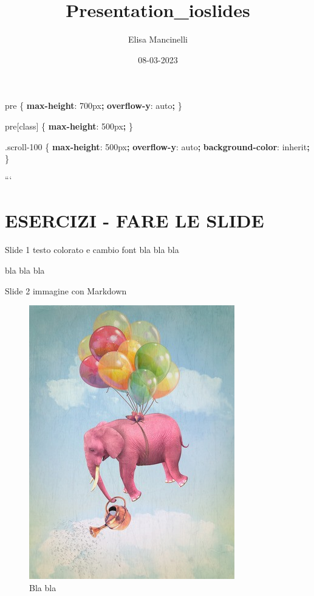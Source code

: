 \documentclass[
  ignorenonframetext,
]{beamer}
\title{Presentation\_ioslides}
\author{Elisa Mancinelli}
\date{08-03-2023}
\newenvironment{Shaded}{\begin{snugshade}}{\end{snugshade}}
\newcommand{\BuiltInTok}[1]{#1}
\newcommand{\DataTypeTok}[1]{\textcolor[rgb]{0.13,0.29,0.53}{#1}}
\newcommand{\DecValTok}[1]{\textcolor[rgb]{0.00,0.00,0.81}{#1}}
\newcommand{\ExtensionTok}[1]{#1}
\newcommand{\FunctionTok}[1]{\textcolor[rgb]{0.00,0.00,0.00}{#1}}
\newcommand{\KeywordTok}[1]{\textcolor[rgb]{0.13,0.29,0.53}{\textbf{#1}}}
\newcommand{\NormalTok}[1]{#1}
\newcommand{\OperatorTok}[1]{\textcolor[rgb]{0.81,0.36,0.00}{\textbf{#1}}}
\begin{document}
\frame{\titlepage}

\begin{frame}[fragile]
\begin{Shaded}
\begin{Highlighting}[]
\NormalTok{pre \{ }
  \KeywordTok{max{-}height}\NormalTok{: }\DecValTok{700}\DataTypeTok{px}\OperatorTok{;}
  \KeywordTok{overflow{-}y}\NormalTok{: }\BuiltInTok{auto}\OperatorTok{;}
\NormalTok{\}}

\NormalTok{pre}\ExtensionTok{[class]}\NormalTok{ \{}
  \KeywordTok{max{-}height}\NormalTok{: }\DecValTok{500}\DataTypeTok{px}\OperatorTok{;}
\NormalTok{\}}

\FunctionTok{.scroll{-}100}\NormalTok{ \{}
  \KeywordTok{max{-}height}\NormalTok{: }\DecValTok{500}\DataTypeTok{px}\OperatorTok{;}
  \KeywordTok{overflow{-}y}\NormalTok{: }\BuiltInTok{auto}\OperatorTok{;}
  \KeywordTok{background{-}color}\NormalTok{: }\BuiltInTok{inherit}\OperatorTok{;}
\NormalTok{\}}
\end{Highlighting}
\end{Shaded}

```
\end{frame}

\hypertarget{esercizi---fare-le-slide}{%
\section{ESERCIZI - FARE LE SLIDE}\label{esercizi---fare-le-slide}}

\begin{frame}{Slide 1 testo colorato e cambio font}
\protect\hypertarget{slide-1-testo-colorato-e-cambio-font}{}
{ bla bla bla }

bla bla bla
\end{frame}

\begin{frame}{Slide 2 immagine con Markdown}
\protect\hypertarget{slide-2-immagine-con-markdown}{}
\begin{figure}
\centering
\includegraphics{image/elefante.jpg}
\caption{{Bla bla}}
\end{figure}
\end{frame}
\end{document}
